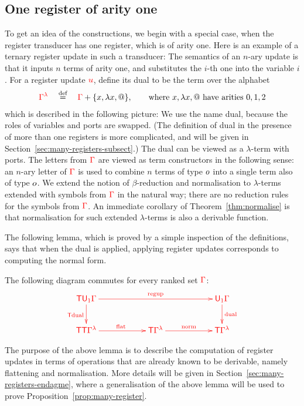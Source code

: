 \subsection{One register of arity one}
To get an idea of the constructions, we begin with a special case, when the register transducer has one register, which is of arity one. Here is an example of a ternary register update in such a transducer:
The semantics of an $n$-ary update is that it inputs $n$ terms of arity one, and substitutes the $i$-th one into the variable $i$. For a register update ${\color{red}{u}}$, define its dual to be the term over the alphabet
\begin{align*}
{\color{red}{{\color{red}{\Gamma}}^\lambda}} \quad \stackrel{\text{def}}= \quad {\color{red}{\Gamma}} + \{x,\lambda x, @\}, \qquad \text{where $x,\lambda x, @$ have arities $0,1,2$}
\end{align*}
 which is described in the following picture:
We use the name dual, because the roles of variables and ports are swapped. (The definition of dual in the presence of more than one registers is more complicated, and will be given in Section~\ref{sec:many-registers-subsect}.)
The dual can be viewed as a $\lambda$-term with ports. The letters from ${\color{red}{\Gamma}}$ are viewed as term constructors in the following sense: an $n$-ary letter of ${\color{red}{\Gamma}}$ is used to combine $n$ terms of type $o$ into a single term also of type $o$. We extend the notion of $\beta$-reduction and normalisation to $\lambda$-terms extended with symbols from ${\color{red}{\Gamma}}$ in the natural way; there are no reduction rules for the symbols from ${\color{red}{\Gamma}}$. An immediate corollary of Theorem~\ref{thm:normalise} is that normalisation for such extended $\lambda$-terms is also a derivable function.

The following lemma, which is proved by a simple inspection  of the definitions, says that when the dual is applied, applying register updates corresponds to computing the normal form. 

\begin{lemma}\label{lem:one-register}
    The following diagram commutes for every ranked set ${\color{red}{\Gamma}}$:
    \begin{align*}\ranked{
        \xymatrix@C=2cm{ 
          \tmonad  \regup \rGamma 1  \ar[rr]^-{\regupt} \ar[d]_{\tmonad \dualt}  &  & \ar[d]^-{\dualt}  \regup \rGamma 1\\
          \tmonad \tmonad \rGamma^\lambda \ar[r]^{\flatt}  &  \tmonad \rGamma^\lambda \ar[r]^{\normt} & \tmonad \rGamma^\lambda  \\
        }}
        \end{align*}
\end{lemma}
The purpose of the above lemma is to describe the computation of  register updates  in terms of operations that are already known to be derivable, namely flattening and normalisation. More details will be given in Section~\ref{sec:many-registers-endagme}, where a generalisation of the above lemma will be used to prove Proposition~\ref{prop:many-register}.


